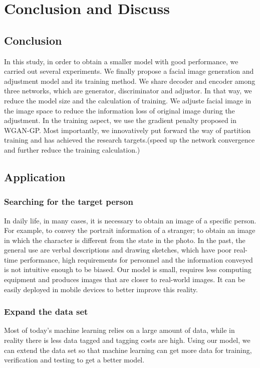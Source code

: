 \section{Conclusion and Discuss}
\subsection{Conclusion}
In this study, in order to obtain a smaller model with good performance, we carried out several experiments.
We finally propose a facial image generation and adjustment model and its training method.
We share decoder and encoder among three networks, which are generator, discriminator and adjustor. In that way, we reduce the model size and the calculation of training.
We adjuste facial image in the image space to reduce the information loss of original image during the adjustment.
In the training aspect, we use the gradient penalty proposed in WGAN-GP. 
Most importantly, we innovatively put forward the way of partition training and has achieved the research targets.(speed up the network convergence and further reduce the training calculation.)

\subsection{Application}
\subsubsection*{Searching for the target person}
In daily life, in many cases, it is necessary to obtain an image of a specific person.
For example, to convey the portrait information of a stranger; to obtain an image in which the character is different from the state in the photo.
In the past, the general use are verbal descriptions and drawing sketches, which have poor real-time performance, high requirements for personnel and the information conveyed is not intuitive enough to be biased.
Our model is small, requires less computing equipment and produces images that are closer to real-world images.
It can be easily deployed in mobile devices to better improve this reality.

\subsubsection*{Expand the data set}
Most of today's machine learning relies on a large amount of data, while in reality there is less data tagged and tagging costs are high.
Using our model, we can extend the data set so that machine learning can get more data for training, verification and testing to get a better model.

